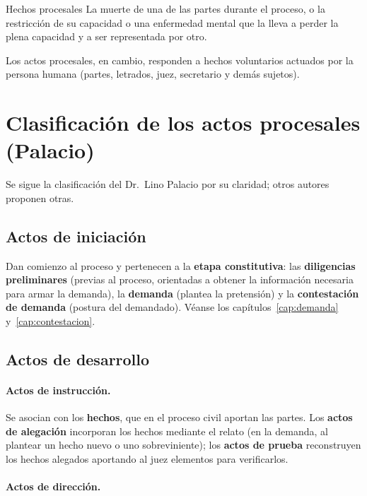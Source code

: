 \documentclass[12pt,oneside]{book}
\begin{document}
\begin{example}{Hechos procesales}
La muerte de una de las partes durante el proceso, o la restricción de su capacidad o una enfermedad mental que la lleva a perder la plena capacidad y a ser representada por otro.
\end{example}

Los actos procesales, en cambio, responden a hechos voluntarios actuados por la persona humana (partes, letrados, juez, secretario y demás sujetos).

\section{Clasificación de los actos procesales (Palacio)}

Se sigue la clasificación del Dr.~Lino Palacio por su claridad; otros autores proponen otras.

\subsection{Actos de iniciación}

Dan comienzo al proceso y pertenecen a la \textbf{etapa constitutiva}: las \textbf{diligencias preliminares} (previas al proceso, orientadas a obtener la información necesaria para armar la demanda), la \textbf{demanda} (plantea la pretensión) y la \textbf{contestación de demanda} (postura del demandado). Véanse los capítulos~\ref{cap:demanda} y~\ref{cap:contestacion}.

\subsection{Actos de desarrollo}

\paragraph{Actos de instrucción.} Se asocian con los \textbf{hechos}, que en el proceso civil aportan las partes. Los \textbf{actos de alegación} incorporan los hechos mediante el relato (en la demanda, al plantear un hecho nuevo o uno sobreviniente); los \textbf{actos de prueba} reconstruyen los hechos alegados aportando al juez elementos para verificarlos.

\paragraph{Actos de dirección.}
\end{document}
